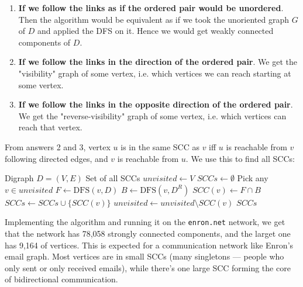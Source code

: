 \documentclass[12pt]{article}
\theoremstyle{definition}
\begin{document}
\begin{enumerate}
  \item \textbf{If we follow the links as if the ordered pair would be unordered}. Then the algorithm would be equivalent as if we took the unoriented graph $G$ of $D$ and applied the DFS on it. Hence we would get weakly connected components of $D$.
  \item \textbf{If we follow the links in the direction of the ordered pair}. We get the "visibility" graph of some vertex, i.e. which vertices we can reach starting at some vertex.
  \item \textbf{If we follow the links in the opposite direction of the ordered pair}. We get the "reverse-visibility" graph of some vertex, i.e. which vertices can reach that vertex.
\end{enumerate}

\noindent
From answers 2 and 3, vertex $u$ is in the same SCC as $v$ iff $u$ is reachable from $v$ following directed edges, and $v$ is reachable from $u$. We use this to find all SCCs:

\begin{algorithm}[H]
  \label{algo:scc}
  \caption{Strongly connected components via forward and backward DFS}
  \begin{algorithmic}[1]
    \Require Digraph $D = (V, E)$
    \Ensure Set of all SCCs
    \State $\textit{unvisited} \gets V$
    \State $\textit{SCCs} \gets \emptyset$
      \State Pick any $v \in \textit{unvisited}$
      \State $F \gets \text{DFS}(v, D)$ 
      \State $B \gets \text{DFS}(v, D^R)$ 
      \State $\textit{SCC}(v) \gets F \cap B$
      \State $\textit{SCCs} \gets \textit{SCCs} \cup \{\textit{SCC}(v)\}$
      \State $\textit{unvisited} \gets \textit{unvisited} \setminus \textit{SCC}(v)$
    \EndWhile
    \State \Return $\textit{SCCs}$
  \end{algorithmic}
\end{algorithm}

Implementing the algorithm and running it on the \texttt{enron.net} network, we get that the network has 78,058 strongly connected components, and the larget one has 9,164 of vertices. This is expected for a communication network like Enron's email graph. Most vertices are in small SCCs (many singletons — people who only sent or only received emails), while there's one large SCC forming the core of bidirectional communication.
\end{document}
